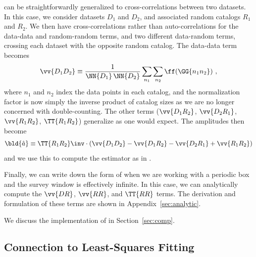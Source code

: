 \Est can be straightforwardly generalized to cross-correlations between two datasets.
In this case, we consider datasets $D_1$ and $D_2$, and associated random catalogs $R_1$ and $R_2$. 
We then have cross-correlations rather than auto-correlations for the data-data and random-random terms, and two different data-random terms, crossing each dataset with the opposite random catalog. 
The data-data term becomes 
\begin{equation}
    \vv{D_1 D_2} \equiv \frac{1}{\NN{D_1}\,\NN{D_2}} \sum_{n_1} \sum_{n_2} \ff(\GG{n_1 n_2}) ~,
\end{equation}
where $n_1$ and $n_2$ index the data points in each catalog, and the normalization factor is now simply the inverse product of catalog sizes as we are no longer concerned with double-counting.
The other terms ($\vv{D_1 R_2}$, $\vv{D_2 R_1}$, $\vv{R_1 R_2}$, $\TT{R_1 R_2}$) generalize as one would expect.
The amplitudes then become
\begin{equation}\displaystyle
    \bld{\hat a} \equiv \TT{R_1 R_2}\inv \cdot (\vv{D_1 D_2} - \vv{D_1 R_2} - \vv{D_2 R_1} + \vv{R_1 R_2})
 \end{equation}
and we use this to compute the estimator as in .

Finally, we can write down the form of \est when we are working with a periodic box and the survey window is effectively infinite.
In this case, we can analytically compute the $\vv{DR}$, $\vv{RR}$, and $\TT{RR}$ terms.
The derivation and formulation of these terms are shown in Appendix~\ref{sec:analytic}.

We discuss the implementation of \est in Section~\ref{sec:comp}.


\subsection{Connection to Least-Squares Fitting}
\label{sec:leastsq}


